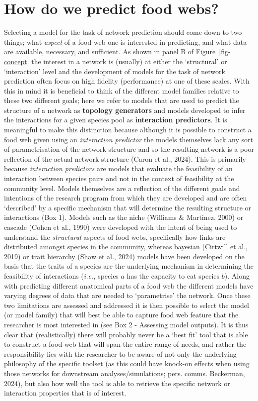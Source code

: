 \documentclass[
]{article}
\begin{document}
\section{How do we predict food webs?}\label{sec-network-build}

Selecting a model for the task of network prediction should come down to
two things; what \emph{aspect} of a food web one is interested in
predicting, and what data are available, necessary, and sufficient. As
shown in panel B of Figure~\ref{fig-concept} the interest in a network
is (usually) at either the `structural' or `interaction' level and the
development of models for the task of network prediction often focus on
high fidelity (performance) at one of these scales. With this in mind it
is beneficial to think of the different model families relative to these
two different goals; here we refer to models that are used to predict
the structure of a network as \textbf{topology generators} and models
developed to infer the interactions for a given species pool as
\textbf{interaction predictors}. It is meaningful to make this
distinction because although it is possible to construct a food web
given using an \emph{interaction predictor} the models themselves lack
any sort of parametrisation of the network structure and so the
resulting network is a poor reflection of the actual network structure
(Caron et al., 2024). This is primarily because \emph{interaction
predictors} are models that evaluate the feasibility of an interaction
between species pairs and not in the context of feasibility at the
community level. Models themselves are a reflection of the different
goals and intentions of the research program from which they are
developed and are often `described' by a specific mechanism that will
determine the resulting structure or interactions (Box 1). Models such
as the niche (Williams \& Martinez, 2000) or cascade (Cohen et al.,
1990) were developed with the intent of being used to understand the
\emph{structural} aspects of food webs, specifically how links are
distributed amongst species in the community, whereas bayesian (Cirtwill
et al., 2019) or trait hierarchy (Shaw et al., 2024) models have been
developed on the basis that the traits of a species are the underlying
mechanism in determining the feasibility of interactions (\emph{i.e.,}
species \(a\) has the capacity to eat species \(b\)). Along with
predicting different anatomical parts of a food web the different models
have varying degrees of data that are needed to `parametrise' the
network. Once these two limitations are assessed and addressed it is
then possible to select the model (or model family) that will best be
able to capture food web feature that the researcher is most interested
in (see Box 2 - Assessing model outputs). It is thus clear that
(realistically) there will probably never be a `best fit' tool that is
able to construct a food web that will span the entire range of needs,
and rather the responsibility lies with the researcher to be aware of
not only the underlying philosophy of the specific toolset (as this
could have knock-on effects when using those networks for downstream
analyses/simulations; pers. comms. Beckerman, 2024), but also how well
the tool is able to retrieve the specific network or interaction
properties that is of interest.
\end{document}
